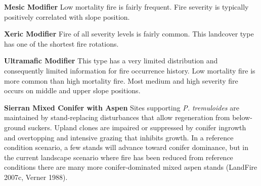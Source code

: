 \begin{adjustwidth}{2cm}{}
\textbf{Mesic Modifier } Low mortality fire is fairly frequent. Fire severity is typically positively correlated with slope position. 

\medskip
\noindent \textbf{Xeric Modifier} Fire of all severity levels is fairly common. This landcover type has one of the shortest fire rotations. 

\medskip
\noindent \textbf{Ultramafic Modifier} This type has a very limited distribution and consequently limited information for fire occurrence history. Low mortality fire is more common than high mortality fire. Most medium and high severity fire occurs on middle and upper slope positions.

\end{adjustwidth}

\medskip
\noindent \textbf{Sierran Mixed Conifer with Aspen} Sites supporting \emph{P. tremuloides} are maintained by stand-replacing disturbances that allow regeneration from below-ground suckers. Upland clones are impaired or suppressed by conifer ingrowth and overtopping and intensive grazing that inhibits growth. In a reference condition scenario, a few stands will advance toward conifer dominance, but in the current landscape scenario where fire has been reduced from reference conditions there are many more conifer-dominated mixed aspen stands (LandFire 2007c, Verner 1988).


